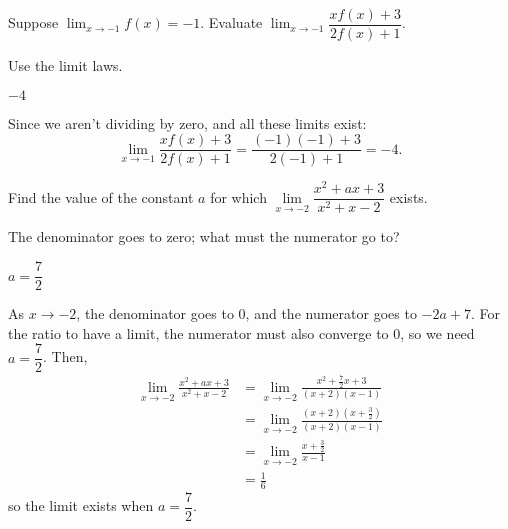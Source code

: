 
\begin{question}Suppose $\displaystyle\lim_{x \rightarrow -1} f(x)=-1$. Evaluate
$\displaystyle\lim_{x \rightarrow -1} \dfrac{xf(x)+3}{2f(x)+1}$.
\end{question}
\begin{hint} Use the limit laws.
\end{hint}
\begin{answer} $-4$
\end{answer}
\begin{solution} Since we aren't dividing by zero, and all these limits exist:
\[\displaystyle\lim_{x \rightarrow -1} \dfrac{xf(x)+3}{2f(x)+1}=
\dfrac{(-1)(-1)+3}{2(-1)+1} = -4.\]
\end{solution}



\begin{Mquestion}[2007H]
Find the value of the constant $a$ for which
$\lim\limits_{x\rightarrow -2}\dfrac{x^2+ax+3}{x^2+x-2}$ exists.
\end{Mquestion}
\begin{hint}
The denominator goes to zero; what must the numerator go to?
\end{hint}
\begin{answer}  $a=\dfrac{7}{2}$
\end{answer}
\begin{solution}
 As $x\rightarrow-2$, the denominator goes to 0,
and the numerator goes to $-2a+7$. For the ratio to have a
limit, the numerator must also converge to $0$, so we need $a=\dfrac{7}{2}$.
Then,
\begin{align*}
\lim_{x \to -2}\frac{x^2+ax+3}{x^2+x-2}&=\lim_{x \to -2}\frac{x^2+\frac{7}{2}x+3}{(x+2)(x-1)}\\
&=\lim_{x \to -2}\frac{(x+2)(x+\frac{3}{2})}{(x+2)(x-1)}\\
&=\lim_{x \to -2}\frac{x+\frac{3}{2}}{x-1}\\
&=\frac{1}{6}
\end{align*}
so the limit exists when $a=\dfrac{7}{2}$.
\end{solution}

